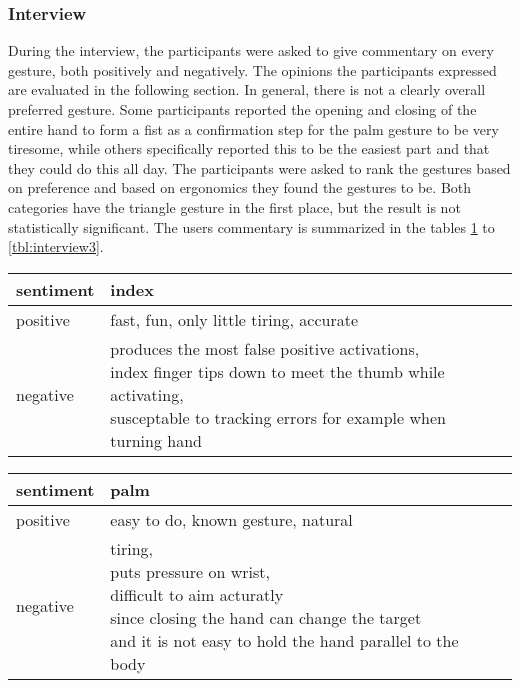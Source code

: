 \subsubsection{Interview}
During the interview, the participants were asked to give commentary on every gesture, both positively and negatively. The opinions the participants expressed are evaluated in the following section. In general, there is not a clearly overall preferred gesture. Some participants reported the opening and closing of the entire hand to form a fist as a confirmation step for the palm gesture to be very tiresome, while others specifically reported this to be the easiest part and that they could do this all day. The participants were asked to rank the gestures based on preference and based on ergonomics they found the gestures to be. Both categories have the triangle gesture in the first place, but the result is not statistically significant. The users commentary is summarized in the tables \ref{tbl:interview1} to \ref{tbl:interview3}. 

\begin{table}[]
\begin{tabular}{llll}
\hline
sentiment &
    index \\ \hline
\multicolumn{1}{|l|}{positive} &
    \multicolumn{1}{l|}{fast, fun, only little tiring, accurate } \\ \hline
negative &
    \makecell{produces the most false positive activations, \\index finger tips down to meet the thumb while activating, \\susceptable to tracking errors for example when turning hand} \\ \hline
\end{tabular}%
\label{tbl:interview1}
\end{table}

\begin{table}[]
\begin{tabular}{llll}
\hline
sentiment &
    palm \\ \hline
\multicolumn{1}{|l|}{positive} &
    \multicolumn{1}{l|}{easy to do, known gesture, natural} \\ \hline
negative &
    \makecell{tiring,\\ puts pressure on wrist,\\ difficult to aim acturatly \\ since closing the hand can change the target\\ and it is not easy to hold the hand parallel to the body} \\ \hline
\end{tabular}%
\label{tbl:interview2}
\end{table}

